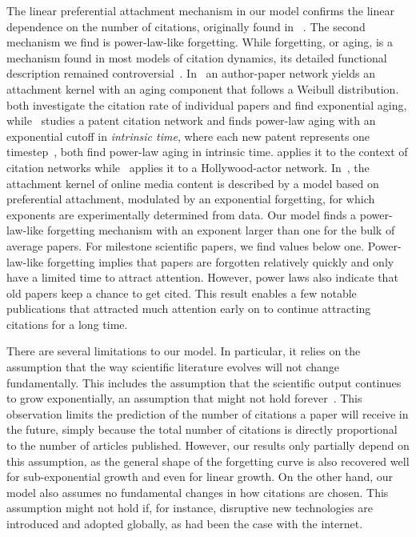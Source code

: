 \documentclass[draft,final]{vutinfth} %
\begin{document}
The linear preferential attachment mechanism in our model confirms the linear dependence on the number of citations, originally found in ~\cite{Jeong_2003}. The second mechanism we find is power-law-like forgetting. While forgetting, or aging, is a mechanism found in most models of citation dynamics, its detailed functional description remained controversial~\cite{Yin2017, Borner2004, Dorogovtsev2000, Valverde2007, Higham2017_2, Safdari2016, Golosovsky2017}. In~\cite{Borner2004} an author-paper network yields an attachment kernel with an aging component that follows a Weibull distribution. \cite{Golosovsky2017, Higham2017_2} both investigate the citation rate of individual papers and find exponential aging, while~\cite{Valverde2007} studies a patent citation network and finds power-law aging with an exponential cutoff in {\em intrinsic time}, where each new patent represents one timestep~\cite{Safdari2016, Dorogovtsev2000},  both find power-law aging in intrinsic time. \cite{Dorogovtsev2000} applies it to the context of citation networks while~\cite{Safdari2016} applies it to a Hollywood-actor network. In~\cite{Lefortier}, the attachment kernel of online media content is described by a model based on preferential attachment, modulated by an exponential forgetting, for which exponents are experimentally determined from data.
Our model finds a power-law-like forgetting mechanism with an exponent larger than one for the bulk of average papers. For milestone scientific papers, we find values below one. Power-law-like forgetting implies that papers are forgotten relatively quickly and only have a limited time to attract attention. However, power laws also indicate that old papers keep a chance to get cited. This result enables a few notable publications that attracted much attention early on to continue attracting citations for a long time. 

There are several limitations to our model. In particular, it relies on the assumption that the way scientific literature evolves will not change fundamentally. This includes the assumption that the scientific output continues to grow exponentially, an assumption that might not hold forever~\cite{Brown2011}. This observation limits the prediction of the number of citations a paper will receive in the future, simply because the total number of citations is directly proportional to the number of articles published. However, our results only partially depend on this assumption, as the general shape of the forgetting curve is also recovered well for sub-exponential growth and even for linear growth. On the other hand, our model also assumes no fundamental changes in how citations are chosen. This assumption might not hold if, for instance, disruptive new technologies are introduced and adopted globally, as had been the case with the internet.
\end{document}
